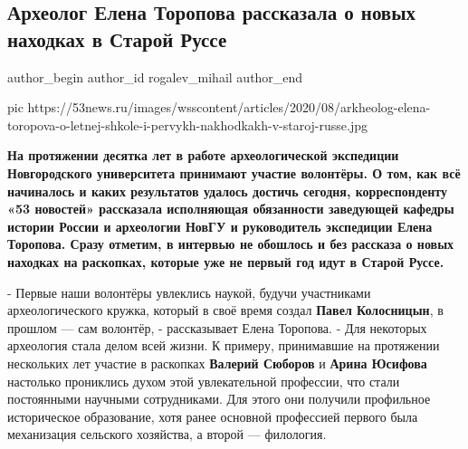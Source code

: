  
 
 
 
 
 
\subsection{Археолог Елена Торопова рассказала о новых находках в Старой Руссе}
\label{sec:05_08_2020.news.ru.53news.rogalev_mihail.1.staraja_russa_arheologia}
\ifcmt
	author_begin
   author_id rogalev_mihail
	author_end
\fi


\ifcmt
pic https://53news.ru/images/wsscontent/articles/2020/08/arkheolog-elena-toropova-o-letnej-shkole-i-pervykh-nakhodkakh-v-staroj-russe.jpg
\fi

\textbf{На протяжении десятка лет в работе археологической экспедиции Новгородского
университета принимают участие волонтёры. О том, как всё начиналось и каких
результатов удалось достичь сегодня, корреспонденту «53 новостей» рассказала
исполняющая обязанности заведующей кафедры истории России и археологии НовГУ и
руководитель экспедиции Елена Торопова. Сразу отметим, в интервью не обошлось и
без рассказа о новых находках на раскопках, которые уже не первый год идут в
Старой Руссе.}

- Первые наши волонтёры увлеклись наукой, будучи участниками археологического
кружка, который в своё время создал \textbf{Павел Колосницын}, в прошлом — сам волонтёр,
- рассказывает Елена Торопова. - Для некоторых археология стала делом всей
жизни. К примеру, принимавшие на протяжении нескольких лет участие в раскопках
\textbf{Валерий Сюборов} и \textbf{Арина Юсифова} настолько прониклись духом этой увлекательной
профессии, что стали постоянными научными сотрудниками. Для этого они получили
профильное историческое образование, хотя ранее основной профессией первого
была механизация сельского хозяйства, а второй — филология.

